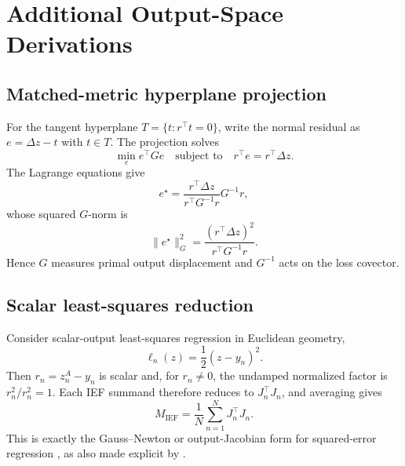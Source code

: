 \section{Additional Output-Space Derivations}

\subsection{Matched-metric hyperplane projection}
\label{app:matched-metric-projection}

For the tangent hyperplane $T=\{t:r^\top t=0\}$, write the normal residual as $e=\Delta z-t$ with $t\in T$. The projection solves
\[
\min_e e^\top G e
\quad\text{subject to}\quad
r^\top e=r^\top\Delta z.
\]
The Lagrange equations give
\[
e^\star
=
\frac{r^\top\Delta z}{r^\top G^{-1}r}G^{-1}r,
\]
whose squared $G$-norm is
\[
\|e^\star\|_G^2
=
\frac{(r^\top\Delta z)^2}{r^\top G^{-1}r}.
\]
Hence $G$ measures primal output displacement and $G^{-1}$ acts on the loss covector.

\subsection{Scalar least-squares reduction}
\label{app:scalar-gauss-newton}

Consider scalar-output least-squares regression in Euclidean geometry,
\[
\ell_n(z)=\frac12(z-y_n)^2.
\]
Then $r_n=z_n^A-y_n$ is scalar and, for $r_n\neq0$, the undamped normalized factor is $r_n^2/r_n^2=1$. Each IEF summand therefore reduces to $J_n^\top J_n$, and averaging gives
\[
M_{\mathrm{IEF}}
=
\frac{1}{N}\sum_{n=1}^N J_n^\top J_n.
\]
This is exactly the Gauss--Newton or output-Jacobian form for squared-error regression \citep{GaussNewton,MartensHF,MartensNG}, as also made explicit by \citet{IEF}.

